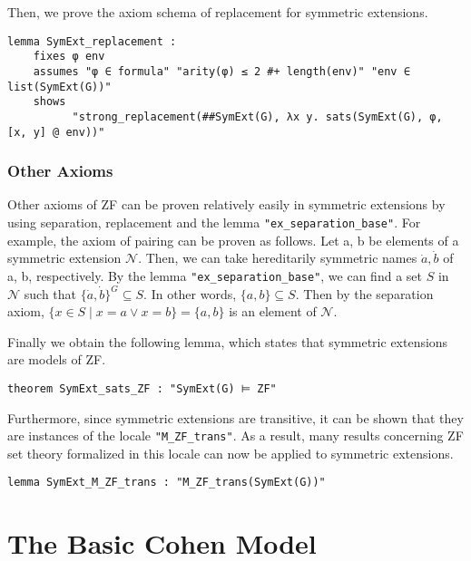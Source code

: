\documentclass{report}
\newenvironment{isaframe}{\begin{mdframed}[topline=false, rightline=false, bottomline=false]}{\end{mdframed}}
\begin{document}
Then, we prove the axiom schema of replacement for symmetric extensions.
\begin{isaframe}
\begin{verbatim}
lemma SymExt_replacement :
    fixes φ env
    assumes "φ ∈ formula" "arity(φ) ≤ 2 #+ length(env)" "env ∈ list(SymExt(G))" 
    shows 
          "strong_replacement(##SymExt(G), λx y. sats(SymExt(G), φ, [x, y] @ env))" 
\end{verbatim}
\end{isaframe}

\subsubsection{Other Axioms}
Other axioms of ZF can be proven relatively easily in symmetric extensions by using separation, replacement and the lemma \texttt{"ex\_separation\_base"}.
For example, the axiom of pairing can be proven as follows. 
Let a, b be elements of a symmetric extension $\mathcal{N}$.
Then, we can take hereditarily symmetric names $\dot{a}, \dot{b}$ of a, b, respectively.
By the lemma \texttt{"ex\_separation\_base"}, we can find a set $S$ in $\mathcal{N}$ such that $\{ \dot{a}, \dot{b} \}^G \subseteq S$.
In other words, $\{ a, b \} \subseteq S$. 
Then by the separation axiom, $\{ x \in S \mid x = a \lor x = b \} = \{ a, b \}$ is an element of $\mathcal{N}$.

Finally we obtain the following lemma, which states that symmetric extensions are models of ZF.
\begin{isaframe}
\begin{verbatim}
theorem SymExt_sats_ZF : "SymExt(G) ⊨ ZF" 
\end{verbatim}
\end{isaframe}

Furthermore, since symmetric extensions are transitive, it can be shown that they are 
instances of the locale \texttt{"M\_ZF\_trans"}.
As a result, many results concerning ZF set theory formalized in this locale can now be applied to symmetric extensions.

\begin{isaframe}
\begin{verbatim}
lemma SymExt_M_ZF_trans : "M_ZF_trans(SymExt(G))"
\end{verbatim}
\end{isaframe}

\section{The Basic Cohen Model}
\end{document}
